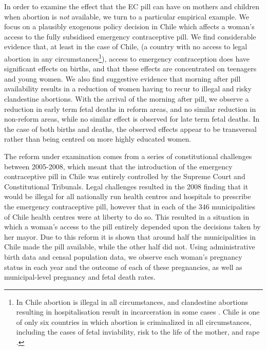 In order to examine the effect that the EC pill can have on mothers and children 
when abortion is \emph{not} available, we turn to a particular empirical example.  
We focus on a plausibly exogenous policy decision in Chile which affects a 
woman's access to the fully subsidised emergency contraceptive pill.  We find 
considerable evidence that, at least in the case of Chile, (a country with no 
access to legal abortion in any circumstances\footnote{In Chile abortion is 
illegal in all circumstances, and clandestine abortions resulting in 
hospitalisation result in incarceration in some cases \citep{ShepardCasas2007}.  
Chile is one of only six countries in which abortion is criminalized in all 
circumstances, including the cases of fetal inviability, risk to the life of the 
mother, and rape \citep{UN2014}.}), access to emergency contraception does have 
significant effects on births, and that these effects are concentrated on 
teenagers and young women.  We also find suggestive evidence that morning after 
pill availability results in a reduction of women having to recur to illegal and 
risky clandestine abortions.  With the arrival of the morning after pill, we 
observe a reduction in early term fetal deaths in reform areas, and no similar 
reduction in non-reform areas, while no similar effect is observed for late term 
fetal deaths.  In the case of both births and deaths, the observed effects appear 
to be transversal rather than being centred on more highly educated women.

The reform under examination comes from a series of constitutional challenges 
between 2005-2008, which meant that the introduction of the emergency contraceptive 
pill in Chile was entirely controlled by the Supreme Court and Constitutional 
Tribunals.  Legal challenges resulted in the 2008 finding that it would be illegal 
for all nationally run health centres and hospitals to prescribe the emergency 
contraceptive pill, however that in each of the 346 municipalities of Chile health 
centres were at liberty to do so.  This resulted  in a situation in which a woman's 
access to the pill entirely depended upon the decisions taken by her mayor.  Due 
to this reform it is shown that around half the municipalities in Chile made the 
pill available, while the other half did not.  Using administrative birth data and 
censal population data, we observe each woman's pregnancy status in each year and 
the outcome of each of these pregnancies, as well as municipal-level pregnancy and 
fetal death rates.

